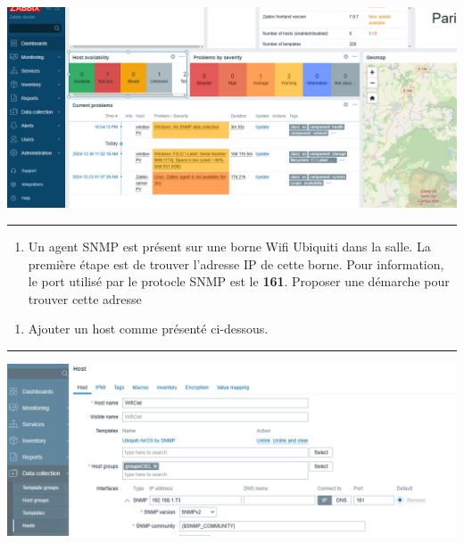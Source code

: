 \documentclass[french, 12pt]{article}%
\newif\ifPROF
\begin{document}
\begin{center}
\includegraphics[scale=0.4]{./ressource/zabbix.png}
\end{center}

\begin{center}
 \rule{0.75\linewidth}{1pt}
 \end{center}

\begin{enumerate}
\item Un agent SNMP est présent sur une borne Wifi Ubiquiti dans la salle. La première étape est de trouver l'adresse IP de cette borne. Pour information, le port utilisé par le protocle SNMP est le \textbf{161}. Proposer une démarche pour trouver cette adresse


\end{enumerate}

\ifPROF
\color{red}
Il faut utiliser la commande nmap sur le réseau et regarder si l'on obtient une ligne comme ci-dessous. (SNMP ouvert).
\begin{lstlisting}[style=commande]
nmap -p 161 192.168.1.0/24     

Nmap scan report for NanoHD (192.168.1.122)
Host is up (0.0032s latency).

PORT    STATE SERVICE
161/tcp open  snmp
MAC Address: 78:45:58:FA:AD:2F (Ubiquiti Networks)

\end{lstlisting}
\normalcolor
\fi


\begin{enumerate}[resume]
\item Ajouter un host comme présenté ci-dessous. 
\end{enumerate}


\begin{center}
 \rule{0.75\linewidth}{1pt}
 \end{center}

\begin{center}
\includegraphics[scale=0.4]{./ressource/wifiSnmp}
\end{center}
\end{document}
